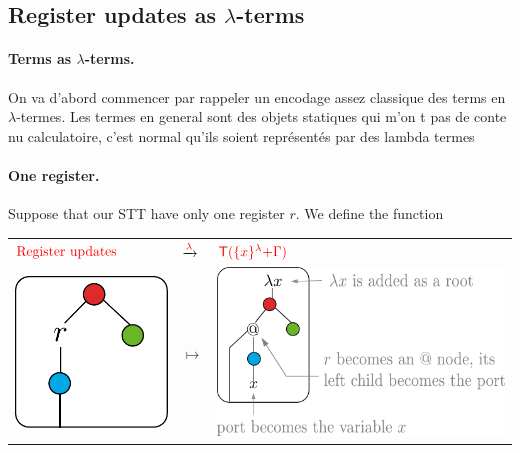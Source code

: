 \subsection{Register updates as $\lambda$-terms}\label{subsec:ru-as-lambda}
\paragraph{Terms as $\lambda$-terms.} On va d'abord commencer par rappeler un encodage assez classique des terms en $\lambda$-termes.
Les termes en general sont des objets statiques qui m'on t pas de conte nu calculatoire, c'est normal qu'ils soient représentés par des lambda termes 
\paragraph{One register.} Suppose that our STT have only one register $r$. We define the function
\begin{center}
\begin{tabular}{>{\centering\arraybackslash}m{} >{\centering\arraybackslash}m{} >{\centering\arraybackslash}m{}}
${\color{red}{\text{Register updates}}}$ & $\xrightarrow{{\color{red}{\lambda}}}$ & ${\color{red}{{\color{red}{\mathsf T}}(\{x\}^{\color{red}{\lambda}}{\color{red}{+ \Gamma}})}}$ \\
\includegraphics[scale=.3]{unary-register-update.pdf} & $\mapsto$ & \includegraphics[scale=.3]{its-encoding.pdf}
\end{tabular}
\end{center}
